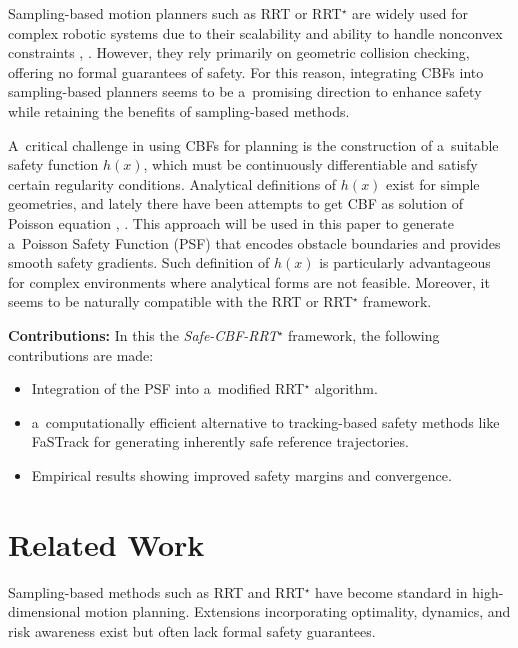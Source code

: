 \documentclass[letterpaper, 10 pt, conference]{ieeeconf}
\begin{document}
Sampling-based motion planners such as RRT or RRT$^\star$ are widely used for complex
robotic systems due to their scalability and ability to handle nonconvex
constraints \cite{LaValle1998RapidlyexploringRT},
\cite{karaman2011samplingbasedalgorithmsoptimalmotion}.
However, they rely primarily on geometric collision checking,
offering no formal guarantees of safety. For this reason, integrating CBFs into
sampling-based planners seems to be a~promising direction to enhance safety while
retaining the benefits of sampling-based methods.

A~critical challenge in using CBFs for planning is the construction of
a~suitable safety function $h(x)$, which must be continuously differentiable
and satisfy certain regularity conditions. Analytical definitions of $h(x)$
exist for simple geometries, and lately there have been attempts to get CBF as
solution of Poisson equation \cite{bahati2025dynamicsafetycomplexenvironments},
\cite{BahatiSafeSS}.
This approach will be used in this paper to generate a~Poisson Safety Function
(PSF) that encodes obstacle boundaries and provides smooth safety gradients.
Such definition of $h(x)$ is particularly advantageous for complex environments where
analytical forms are not feasible. Moreover, it seems to be naturally compatible with
the RRT or RRT$^\star$ framework.

\textbf{Contributions:}
In this the \emph{Safe-CBF-RRT$^\star$} framework, the following contributions are made:
\begin{itemize}
    \item Integration of the PSF into a~modified RRT$^\star$ algorithm.
    \item a~computationally efficient alternative to tracking-based safety
    methods
    like FaSTrack for generating inherently safe reference trajectories.
    \item Empirical results showing improved safety margins and convergence.
\end{itemize}

\section{Related Work}
Sampling-based methods such as RRT and RRT$^\star$ \cite{karaman2011samplingbasedalgorithmsoptimalmotion} have
become standard in high-dimensional motion planning. Extensions incorporating
optimality, dynamics, and risk awareness exist but often lack formal safety guarantees.
\end{document}
